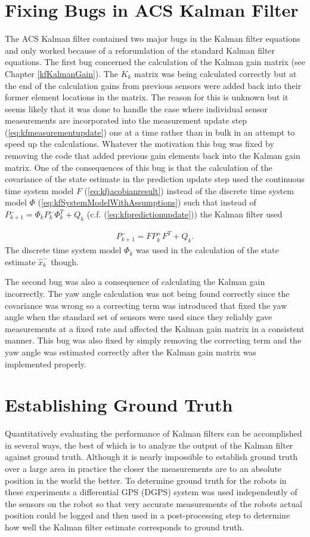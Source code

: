 \section{Fixing Bugs in ACS Kalman Filter}
\label{sec:kfBugs}
The ACS Kalman filter contained two major bugs in the Kalman filter equations and only worked because of a reforumlation of the standard Kalman filter equations. The first bug concerned the calculation of the Kalman gain matrix (see Chapter \ref{kfKalmanGain}). The $K_k$ matrix was being calculated correctly but at the end of the calculation gains from previous sensors were added back into their former element locations in the matrix. The reason for this is unknown but it seems likely that it was done to handle the case where individual sensor measurements are incorporated into the measurement update step (\ref{eq:kfmeasurementupdate}) one at a time rather than in bulk in an attempt to speed up the calculations. Whatever the motivation this bug was fixed by removing the code that added previous gain elements back into the Kalman gain matrix. One of the consequences of this bug is that the calculation of the covariance of the state estimate in the prediction update step used the continuous time system model $F$ (\ref{eq:kfjacobianresult}) instead of the discrete time system model $\Phi$ (\ref{eq:kfSystemModelWithAssumptions}) such that instead of $P_{k+1}^- = \Phi_kP_k^-\Phi_k^T + Q_k$ (c.f. (\ref{eq:kfpredictionupdate})) the Kalman filter used

\begin{align*}
P_{k+1}^- = FP_k^+F^T + Q_k.
\end{align*}
The discrete time system model $\Phi_k$ was used in the calculation of the state estimate $\hat{x}_k^-$ though.

The second bug was also a consequence of calculating the Kalman gain incorrectly. The yaw angle calculation was not being found correctly since the covariance was wrong so a correcting term was introduced that fixed the yaw angle when the standard set of sensors were used since they reliably gave measurements at a fixed rate and affected the Kalman gain matrix in a consistent manner. This bug was also fixed by simply removing the correcting term and the yaw angle was estimated correctly after the Kalman gain matrix was implemented properly.

\section{Establishing Ground Truth}
\label{sec:groundtruth}
Quantitatively evaluating the performance of Kalman filters can be accomplished in several ways, the best of which is to analyze the output of the Kalman filter against ground truth. Although it is nearly impossible to establish ground truth over a large area in practice the closer the measurements are to an absolute position in the world the better. To determine ground truth for the robots in these experiments a differential GPS (DGPS) system was used independently of the sensors on the robot so that very accurate measurements of the robots actual position could be logged and then used in a post-processing step to determine how well the Kalman filter estimate corresponds to ground truth.


